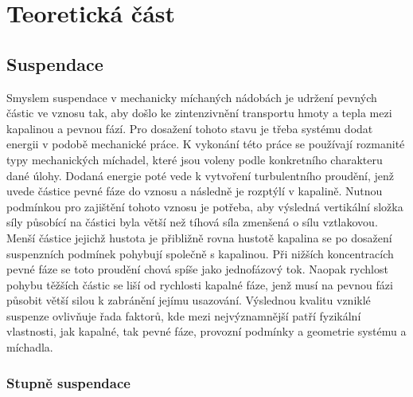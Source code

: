\chapter{Teoretická část}
\section{Suspendace}
Smyslem suspendace v mechanicky míchaných nádobách je udržení pevných částic ve vznosu tak, aby došlo ke zintenzivnění transportu hmoty a tepla mezi kapalinou a pevnou fází. Pro dosažení tohoto stavu je třeba systému dodat energii v podobě mechanické práce. K vykonání této práce se používají rozmanité typy mechanických míchadel, které jsou voleny podle konkretního charakteru dané úlohy. Dodaná energie poté vede k vytvoření turbulentního proudění, jenž uvede částice pevné fáze do vznosu a následně je rozptýlí v kapalině. Nutnou podmínkou pro zajištění tohoto vznosu je potřeba, aby výsledná vertikální složka síly působící na částici byla větší než tíhová síla zmenšená o sílu vztlakovou. Menší částice jejichž hustota je přibližně rovna hustotě kapalina se po dosažení suspenzních podmínek pohybují společně s kapalinou. Při nižších koncentracích pevné fáze se toto proudění chová spíše jako jednofázový tok. Naopak rychlost pohybu těžších částic se liší od rychlosti kapalné fáze, jenž musí na pevnou fázi působit větší silou k zabránění jejímu usazování. Výslednou kvalitu vzniklé suspenze ovlivňuje řada faktorů, kde mezi nejvýznamnější patří fyzikální vlastnosti, jak kapalné, tak pevné fáze, provozní podmínky a geometrie systému a míchadla.

\subsection{Stupně suspendace}


